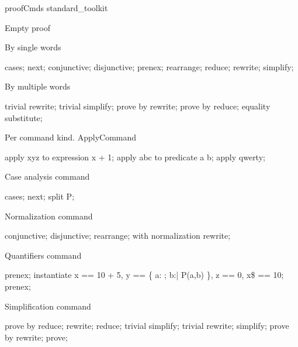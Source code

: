 \begin{zsection}
   \SECTION proofCmds \parents standard\_toolkit
\end{zsection}

Empty proof

\begin{zproof}[emptyProof]
\end{zproof}

By single words

\begin{zproof}[singleWord]
cases;
next;
conjunctive;
disjunctive;
prenex;
rearrange;
reduce;
rewrite;
simplify;
\end{zproof}

By multiple words

\begin{zproof}[multipleWords]
trivial rewrite;
trivial simplify;
prove by
  rewrite;
prove by        
    reduce;     %
equality substitute;
\end{zproof}

Per command kind. ApplyCommand

\begin{zproof}[applyWordComplex]
apply xyz to expression x + 1;
apply abc to predicate a \in b;
apply qwerty;
\end{zproof}

Case analysis command

\begin{zproof}[caseAnalysisCmd]
cases;
next;
split P;
\end{zproof}

Normalization command

\begin{zproof}[normCmd]
conjunctive;    %
disjunctive;
rearrange;
with normalization rewrite;
\end{zproof}

Quantifiers command

\begin{zproof}[qntCmd]
prenex;
instantiate x == 10 + 5, y == \{ a: \nat; b:\nat | P(a,b) \},
    z == 0, x\$ == 10;  %
prenex;
\end{zproof}

Simplification command

\begin{zproof}[simpCmd]
prove by reduce;
rewrite;
reduce;
trivial simplify;
trivial rewrite;
simplify;
prove by rewrite;
prove;
\end{zproof}

